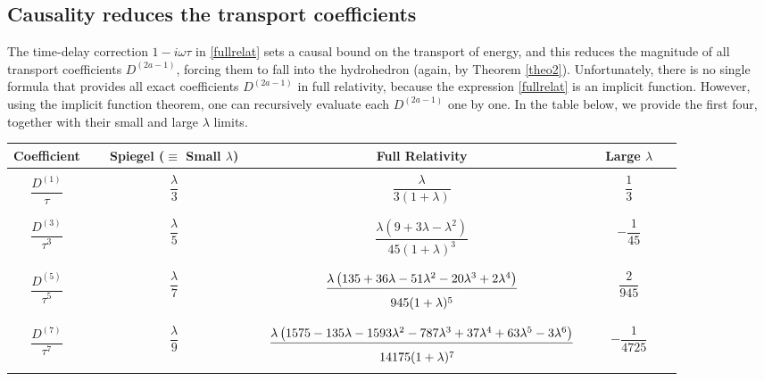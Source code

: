 \documentclass[a4paper, amsfonts, amssymb, amsmath, reprint, showkeys, nofootinbib, twoside,notitlepage,onecolumn]{revtex4-2}
\theoremstyle{definition}
\theoremstyle{theorem}
\theoremstyle{corollary}
\begin{document}
\subsection{Causality reduces the transport coefficients}

The time-delay correction $1-i\omega\tau$ in \eqref{fullrelat} sets a causal bound on the transport of energy, and this reduces the magnitude of all transport coefficients $D^{(2a-1)}$, forcing them to fall into the hydrohedron (again, by Theorem \ref{theo2}). Unfortunately, there is no single formula that provides all exact coefficients $D^{(2a-1)}$ in full relativity, because the expression \eqref{fullrelat} is an implicit function. However, using the implicit function theorem, one can recursively evaluate each $D^{(2a-1)}$ one by one. In the table below, we provide the first four, together with their small and large $\lambda$ limits.


\begin{table}[h!]
    \centering
    \begin{tabular}{|c|c|c|c|}
\hline
Coefficient & $\quad$ Spiegel \cite{Spiegel1957} ($\equiv$ Small $\lambda$) $\quad$ & Full Relativity & $\quad$ Large $\lambda$  $\quad$  \\
\hline
\hline
& & & \\[-1em]
$\dfrac{D^{(1)}}{\tau}$   & $\dfrac{\lambda}{3}$ & $\dfrac{\lambda}{3(1+\lambda)}$ & $\dfrac{1}{3}$ \\
& & & \\[-1em]
\hline
& & & \\[-1em]
$\dfrac{D^{(3)}}{\tau^3}$   & $\dfrac{\lambda}{5}$ & $\dfrac{\lambda  \left(9+3\lambda-\lambda ^2\right)}{45 (1+\lambda)^3}$ & $-\dfrac{1}{45}$ \\
& & & \\[-1em]
\hline
& & & \\[-1em]
$\dfrac{D^{(5)}}{\tau^5}$   & $\dfrac{\lambda}{7}$ & $\dfrac{\lambda  \left(135+36 \lambda-51 \lambda ^2-20 \lambda ^3+2 \lambda ^4 \right)}{\textcolor{white}{\dfrac{1}{1}} 945 (1+\lambda)^5\textcolor{white}{\dfrac{1}{1}}}$ & $\dfrac{2}{945}$ \\
\hline
& & & \\[-1em]
$\dfrac{D^{(7)}}{\tau^7}$   & $\dfrac{\lambda}{9}$ & $\dfrac{\lambda  \left(1575-135 \lambda-1593 \lambda ^2-787 \lambda ^3+37 \lambda ^4+63 \lambda ^5 -3 \lambda ^6 \right)}{14175 (1+\lambda)^7\textcolor{white}{\dfrac{1}{1}}}$  & $-\dfrac{1}{4725}$ \\
\hline
\end{tabular}
\end{table}
\end{document}
